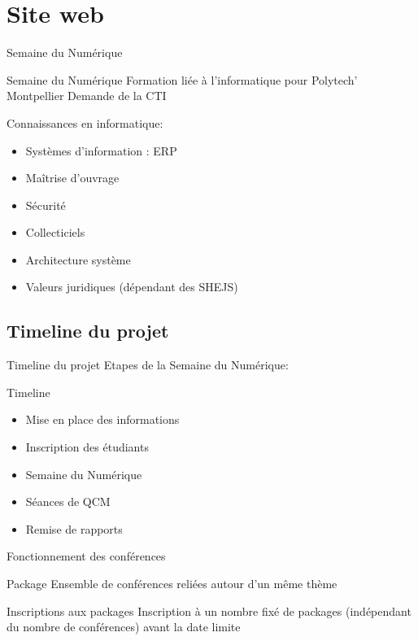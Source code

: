\section{Site web}

\begin{frame}{Semaine du Numérique}
    \begin{block}{Semaine du Numérique}
    Formation liée à l'informatique pour Polytech' Montpellier
    Demande de la CTI

    Connaissances en informatique:
    \begin{itemize}
    \item Systèmes d’information : ERP
    \item Maîtrise d’ouvrage
    \item Sécurité
    \item Collecticiels
    \item Architecture système
    \item Valeurs juridiques (dépendant des SHEJS)
    \end{itemize}
    \end{block}
\end{frame}

\subsection{Timeline du projet}
\begin{frame}{Timeline du projet}
    Etapes de la Semaine du Numérique:
    \begin{block}{Timeline}
    \begin{itemize}
    \item Mise en place des informations
    \item Inscription des étudiants
    \item Semaine du Numérique
    \item Séances de QCM
    \item Remise de rapports
    \end{itemize}
    \end{block}
\end{frame}

\begin{frame}{Fonctionnement des conférences}
    \begin{block}{Package}
    Ensemble de conférences reliées autour d'un même thème
    \end{block}

    \begin{block}{Inscriptions aux packages}
    Inscription à un nombre fixé de packages (indépendant du nombre de conférences) avant la date limite
    \end{block}
\end{frame}

